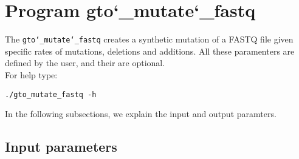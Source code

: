\section{Program gto\char`_mutate\char`_fastq}
The \texttt{gto\char`_mutate\char`_fastq} creates a synthetic mutation of a FASTQ file given specific rates of mutations, deletions and additions. All these paramenters are defined by the user, and their are optional.\\
For help type:
\begin{lstlisting}
./gto_mutate_fastq -h
\end{lstlisting}
In the following subsections, we explain the input and output paramters.

\subsection*{Input parameters}

